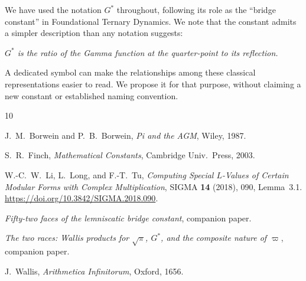 \documentclass[12pt,reqno]{amsart}
\theoremstyle{definition}
\theoremstyle{remark}
\newcommand{\Gstar}{G^{\!*}}
\newcommand{\varpiup}{\varpi}
\begin{document}
We have used the notation $\Gstar$ throughout, following its role as the
``bridge constant'' in Foundational Ternary Dynamics.  We note that the
constant admits a simpler description than any notation suggests:

\medskip
\begin{center}
\emph{$\Gstar$ is the ratio of the Gamma function at the
quarter-point to its reflection.}
\end{center}
\medskip

\noindent
A dedicated symbol can make the relationships among these classical
representations easier to read. We propose it for that purpose,
without claiming a new constant or established naming convention.



\begin{thebibliography}{10}

J.~M.~Borwein and P.~B.~Borwein,
\emph{Pi and the AGM}, Wiley, 1987.

S.~R.~Finch,
\emph{Mathematical Constants}, Cambridge Univ.\ Press, 2003.

W.-C.~W.~Li, L.~Long, and F.-T.~Tu,
\emph{Computing Special $L$-Values of Certain Modular Forms with Complex
Multiplication}, SIGMA \textbf{14} (2018), 090, Lemma~3.1.
\url{https://doi.org/10.3842/SIGMA.2018.090}.

\emph{Fifty-two faces of the lemniscatic bridge constant},
companion paper.

\emph{The two races: Wallis products for $\sqrt{\pi}$, $\Gstar$, and
the composite nature of $\varpiup$},
companion paper.

J.~Wallis,
\emph{Arithmetica Infinitorum}, Oxford, 1656.

\end{thebibliography}
\end{document}
